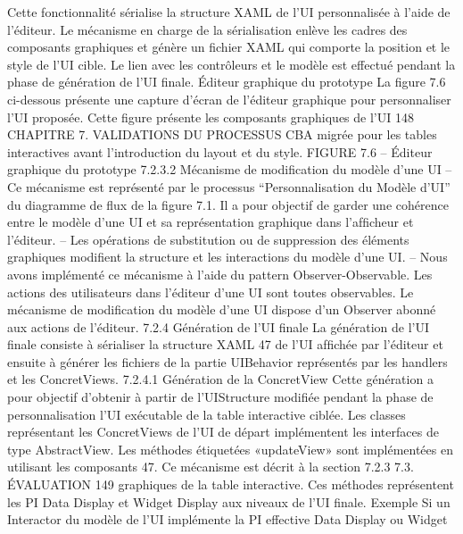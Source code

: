 \documentclass{article}
\begin{document}
Cette fonctionnalit\'{e} s\'{e}rialise la
structure XAML de l’UI personnalis\'{e}e \`{a} l’aide de l’\'{e}diteur. Le m\'{e}canisme en charge de la s\'{e}rialisation
enl\`{e}ve les cadres des composants graphiques et g\'{e}n\`{e}re un ﬁchier XAML qui comporte la position et le
style de l’UI cible. Le lien avec les contr\^{o}leurs et le mod\`{e}le est effectu\'{e} pendant la phase de g\'{e}n\'{e}ration
de l’UI ﬁnale.
Éditeur graphique du prototype
La ﬁgure 7.6 ci-dessous pr\'{e}sente une capture d’\'{e}cran de l’\'{e}diteur
graphique pour personnaliser l’UI propos\'{e}e. Cette ﬁgure pr\'{e}sente les composants graphiques de l’UI
148
CHAPITRE 7. VALIDATIONS DU PROCESSUS
CBA migr\'{e}e pour les tables interactives avant l’introduction du layout et du style.
FIGURE 7.6 – Éditeur graphique du prototype
7.2.3.2
M\'{e}canisme de modiﬁcation du mod\`{e}le d’une UI
– Ce m\'{e}canisme est repr\'{e}sent\'{e} par le processus “Personnalisation du Mod\`{e}le d’UI” du diagramme de ﬂux de la ﬁgure 7.1. Il a pour objectif de garder une coh\'{e}rence entre le mod\`{e}le
d’une UI et sa repr\'{e}sentation graphique dans l’afﬁcheur et l’\'{e}diteur.
– Les op\'{e}rations de substitution ou de suppression des \'{e}l\'{e}ments graphiques modiﬁent la structure
et les interactions du mod\`{e}le d’une UI.
– Nous avons impl\'{e}ment\'{e} ce m\'{e}canisme \`{a} l’aide du pattern Observer-Observable. Les actions
des utilisateurs dans l’\'{e}diteur d’une UI sont toutes observables. Le m\'{e}canisme de modiﬁcation
du mod\`{e}le d’une UI dispose d’un Observer abonn\'{e} aux actions de l’\'{e}diteur.
7.2.4
G\'{e}n\'{e}ration de l’UI ﬁnale
La g\'{e}n\'{e}ration de l’UI ﬁnale consiste \`{a} s\'{e}rialiser la structure XAML 47 de l’UI afﬁch\'{e}e par l’\'{e}diteur
et ensuite \`{a} g\'{e}n\'{e}rer les ﬁchiers de la partie UIBehavior repr\'{e}sent\'{e}s par les handlers et les ConcretViews.
7.2.4.1
G\'{e}n\'{e}ration de la ConcretView
Cette g\'{e}n\'{e}ration a pour objectif d’obtenir \`{a} partir de l’UIStructure modiﬁ\'{e}e pendant la phase de
personnalisation l’UI ex\'{e}cutable de la table interactive cibl\'{e}e.
Les classes repr\'{e}sentant les ConcretViews de l’UI de d\'{e}part impl\'{e}mentent les interfaces de type
AbstractView. Les m\'{e}thodes \'{e}tiquet\'{e}es «updateView» sont impl\'{e}ment\'{e}es en utilisant les composants
47. Ce m\'{e}canisme est d\'{e}crit \`{a} la section 7.2.3
7.3. ÉVALUATION
149
graphiques de la table interactive. Ces m\'{e}thodes repr\'{e}sentent les PI Data Display et Widget Display
aux niveaux de l’UI ﬁnale.
Exemple
Si un Interactor du mod\`{e}le de l’UI impl\'{e}mente la PI effective Data Display ou Widget
\end{document}

